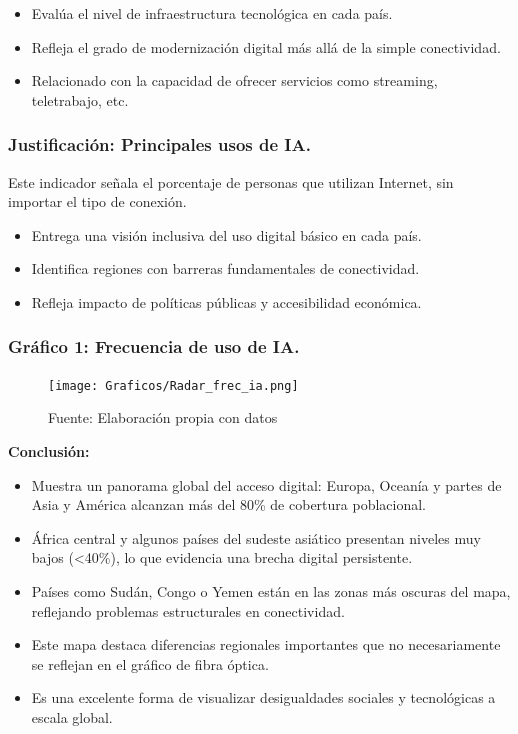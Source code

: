 \documentclass[12pt, a4paper]{article}
\begin{document}
\begin{itemize}
    \item Evalúa el nivel de infraestructura tecnológica en cada país.
    \item Refleja el grado de modernización digital más allá de la simple conectividad.
    \item Relacionado con la capacidad de ofrecer servicios como streaming, teletrabajo, etc.
\end{itemize}

\subsubsection*{Justificación: Principales usos de IA.}
Este indicador señala el porcentaje de personas que utilizan Internet, sin importar el tipo de conexión.

\begin{itemize}
    \item Entrega una visión inclusiva del uso digital básico en cada país.
    \item Identifica regiones con barreras fundamentales de conectividad.
    \item Refleja impacto de políticas públicas y accesibilidad económica.
\end{itemize}

\subsubsection*{Gráfico 1: Frecuencia de uso de IA.}
\begin{figure}[H]
    \centering
    \texttt{[image: Graficos/Radar\_frec\_ia.png]}
    \caption[1]{Fuente: Elaboración propia con datos}
\end{figure}

\textbf{Conclusión:}
\begin{itemize}
    \item Muestra un panorama global del acceso digital: Europa, Oceanía y partes de Asia y América alcanzan más del 80\% de cobertura poblacional.
    \item África central y algunos países del sudeste asiático presentan niveles muy bajos (<40\%), lo que evidencia una brecha digital persistente.
    \item Países como Sudán, Congo o Yemen están en las zonas más oscuras del mapa, reflejando problemas estructurales en conectividad.
    \item Este mapa destaca diferencias regionales importantes que no necesariamente se reflejan en el gráfico de fibra óptica.
    \item Es una excelente forma de visualizar desigualdades sociales y tecnológicas a escala global.
\end{itemize}
\end{document}
